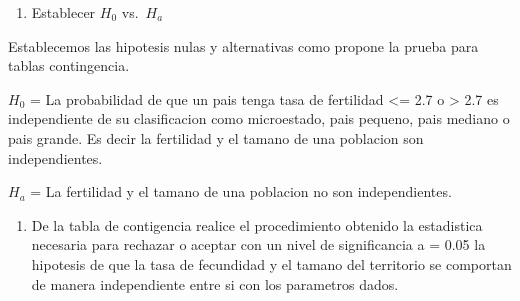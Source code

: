 \documentclass[
]{article}
\providecommand{\tightlist}{%
  \setlength{\itemsep}{0pt}\setlength{\parskip}{0pt}}
\begin{document}
\begin{enumerate}
\def\labelenumi{\alph{enumi})}
\tightlist
\item
  Establecer \(H_0\) vs.~\(H_a\)
\end{enumerate}

Establecemos las hipotesis nulas y alternativas como propone la prueba
para tablas contingencia.

\(H_0\) = La probabilidad de que un pais tenga tasa de fertilidad
\textless= 2.7 o \textgreater{} 2.7 es independiente de su clasificacion
como microestado, pais pequeno, pais mediano o pais grande. Es decir la
fertilidad y el tamano de una poblacion son independientes.

\(H_a\) = La fertilidad y el tamano de una poblacion no son
independientes.

\begin{enumerate}
\def\labelenumi{\alph{enumi})}
\setcounter{enumi}{1}
\tightlist
\item
  De la tabla de contigencia realice el procedimiento obtenido la
  estadistica necesaria para rechazar o aceptar con un nivel de
  significancia a = 0.05 la hipotesis de que la tasa de fecundidad y el
  tamano del territorio se comportan de manera independiente entre si
  con los parametros dados.
\end{enumerate}
\end{document}
